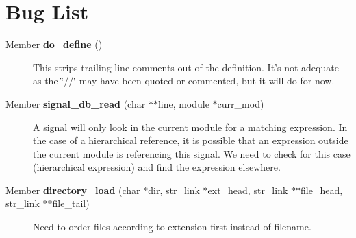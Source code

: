 \section{Bug List}\label{bug}
\label{_bug000001}
 \begin{description}
\item[Member {\bf do\_\-define} () ]This strips trailing line comments out of the definition. It's not adequate as the \char`\"{}//\char`\"{} may have been quoted or commented, but it will do for now.\end{description}


\label{_bug000002}
 \begin{description}
\item[Member {\bf signal\_\-db\_\-read} (char $\ast$$\ast$line, module $\ast$curr\_\-mod) ]A signal will only look in the current module for a matching expression. In the case of a hierarchical reference, it is possible that an expression outside the current module is referencing this signal. We need to check for this case (hierarchical expression) and find the expression elsewhere.\end{description}


\label{_bug000003}
 \begin{description}
\item[Member {\bf directory\_\-load} (char $\ast$dir, str\_\-link $\ast$ext\_\-head, str\_\-link $\ast$$\ast$file\_\-head, str\_\-link $\ast$$\ast$file\_\-tail) ]Need to order files according to extension first instead of filename.\end{description}
